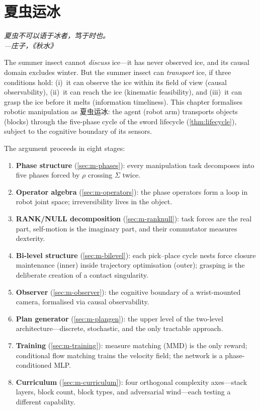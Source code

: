 \chapter{夏虫运冰}\label{sec:manipulation}

\begin{center}
\itshape
夏虫不可以语于冰者，笃于时也。\\[4pt]
\upshape ---庄子，《秋水》
\end{center}

\bigskip

The summer insect cannot \emph{discuss} ice---it has never observed
ice, and its causal domain excludes winter.  But the summer insect can
\emph{transport} ice, if three conditions hold: (i)~it can observe the
ice within its field of view (causal observability), (ii)~it can reach
the ice (kinematic feasibility), and (iii)~it can grasp the ice before
it melts (information timeliness).  This chapter formalises robotic
manipulation as 夏虫运冰: the agent (robot arm) transports objects
(blocks) through the five-phase cycle of the sword lifecycle
(\cref{thm:lifecycle}), subject to the cognitive boundary of its
sensors.

The argument proceeds in eight stages:
\begin{enumerate}
  \item \textbf{Phase structure} (\cref{sec:m-phases}): every
  manipulation task decomposes into five phases forced by
  $\rho$ crossing $\Sigma$ twice.
  \item \textbf{Operator algebra} (\cref{sec:m-operators}): the
  phase operators form a loop in robot joint space; irreversibility
  lives in the object.
  \item \textbf{RANK/NULL decomposition} (\cref{sec:m-ranknull}):
  task forces are the real part, self-motion is the imaginary part,
  and their commutator measures dexterity.
  \item \textbf{Bi-level structure} (\cref{sec:m-bilevel}):
  each pick--place cycle nests force closure maintenance (inner)
  inside trajectory optimisation (outer); grasping is the
  deliberate creation of a contact singularity.
  \item \textbf{Observer} (\cref{sec:m-observer}): the cognitive
  boundary of a wrist-mounted camera, formalised via causal
  observability.
  \item \textbf{Plan generator} (\cref{sec:m-plangen}): the upper
  level of the two-level architecture---discrete, stochastic,
  and the only tractable approach.
  \item \textbf{Training} (\cref{sec:m-training}): measure matching
  (MMD) is the only reward; conditional flow matching trains the
  velocity field; the network is a phase-conditioned MLP.
  \item \textbf{Curriculum} (\cref{sec:m-curriculum}): four
  orthogonal complexity axes---stack layers, block count, block
  types, and adversarial wind---each testing a different
  capability.
\end{enumerate}


